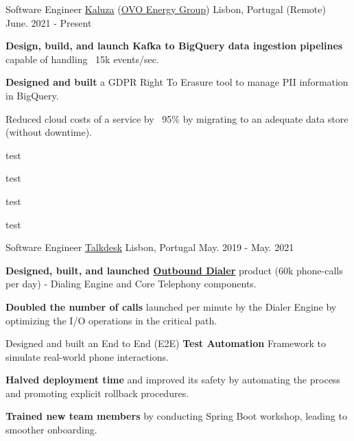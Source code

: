
\begin{cventries}
  \vspace{-2mm}
  \cventry
    {Software Engineer}
    {\href{https://www.kaluza.com/}{Kaluza} (\href{https://www.ovoenergy.com/}{OVO Energy Group})}
    {Lisbon, Portugal (Remote)}
    {June. 2021 - Present}
    {
      \begin{cvitems}
        \item \textbf{Design, build, and launch Kafka to BigQuery data ingestion pipelines} capable of handling ~15k events/sec.
        \item \textbf{Designed and built} a GDPR Right To Erasure tool to manage PII information in BigQuery.
        \item Reduced cloud costs of a service by ~95\% by migrating to an adequate data store (without downtime).
        \item test
        \item test
        \item test
        \item test
      \end{cvitems}
      \vspace{4mm}
    }

  \cventry
    {Software Engineer}
    {\href{https://www.talkdesk.com/}{Talkdesk}}
    {Lisbon, Portugal}
    {May. 2019 - May. 2021}
    {
      \begin{cvitems}
        \item \textbf{Designed, built, and launched \href{https://www.youtube.com/watch?v=W9yJ6gi1ggA}{Outbound Dialer}} product (60k phone-calls per day) - Dialing Engine and Core Telephony components.
        \item \textbf{Doubled the number of calls} launched per minute by the Dialer Engine by optimizing the I/O operations in the critical path.
        \item Designed and built an End to End (E2E) \textbf{Test Automation} Framework to simulate real-world phone interactions.
        \item \textbf{Halved deployment time} and improved its safety by automating the process and promoting explicit rollback procedures.
        \item \textbf{Trained new team members} by conducting Spring Boot workshop, leading to smoother onboarding.
      \end{cvitems}
      \vspace{4mm}
    }
    

\end{cventries}
